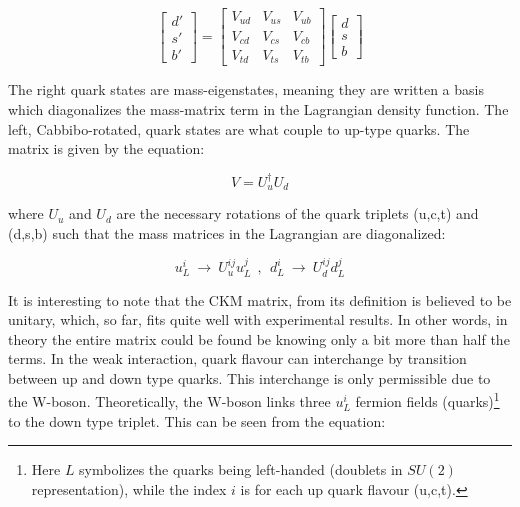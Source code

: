 \documentclass[11pt,a4paper]{article}
\begin{document}

\begin{equation}
\begin{bmatrix}
d' \\ s' \\ b'
\end{bmatrix} =
\begin{bmatrix}
V_{ud} & V_{us} & V_{ub} \\
V_{cd} & V_{cs} & V_{cb} \\
V_{td} & V_{ts} & V_{tb}
\end{bmatrix}
\begin{bmatrix}
d \\ s \\ b
\end{bmatrix}
\label{CKM_matrix}
\end{equation}

The right quark states are mass-eigenstates, meaning they are written a basis which diagonalizes the mass-matrix term in the Lagrangian density function. The left, Cabbibo-rotated, quark states are what couple to up-type quarks. The matrix is given by the equation:

\begin{equation}
V = U_u^\dagger U_d
\end{equation}

where $U_u$ and $U_d$ are the necessary rotations of the quark triplets (u,c,t) and (d,s,b) such that the mass matrices in the Lagrangian are diagonalized:

\begin{equation}
u_L^i \:\rightarrow\: U_u^{ij} u_L^j \:\:,\:\:
d_L^i \:\rightarrow\: U_d^{ij} d_L^j
\end{equation}

It is interesting to note that the CKM matrix, from its definition is believed to be unitary, which, so far, fits quite well with experimental results. In other words, in theory the entire matrix could be found be knowing only a bit more than half the terms. In the weak interaction, quark flavour can interchange by transition between up and down type quarks. This interchange is only permissible due to the W-boson. Theoretically, the W-boson links three $u_L^i$ fermion fields (quarks)\footnote{Here $L$ symbolizes the quarks being left-handed (doublets in $SU(2)$ representation), while the index $i$ is for each up quark flavour (u,c,t).} to the down type triplet. This can be seen from the equation:
\end{document}
